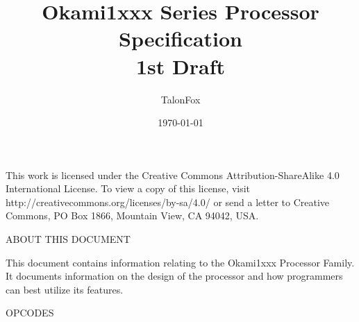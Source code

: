 \documentclass{article}
\title{
    \huge Okami1xxx Series Processor Specification \\
    \LARGE 1st Draft}
\author{\Large TalonFox}
\date{\today}
\begin{document}
\maketitle
\pagebreak

\begin{Large}
\null
\vfill
\begin{center}
This work is licensed under the Creative Commons Attribution-ShareAlike 4.0 International License. To view a copy of this license, visit http://creativecommons.org/licenses/by-sa/4.0/ or send a letter to Creative Commons, PO Box 1866, Mountain View, CA 94042, USA.
\end{center}
\end{Large}
\pagebreak
\begin{flushleft}
\begin{Large}
\begin{Huge}ABOUT THIS DOCUMENT\end{Huge}\newline\newline
This document contains information relating to the Okami1xxx Processor Family. It documents information on the design of the processor
and how programmers can best utilize its features.
\end{Large}

\pagebreak
\begin{Huge}OPCODES\end{Huge}\newline\newline


\end{flushleft}
\end{document}

